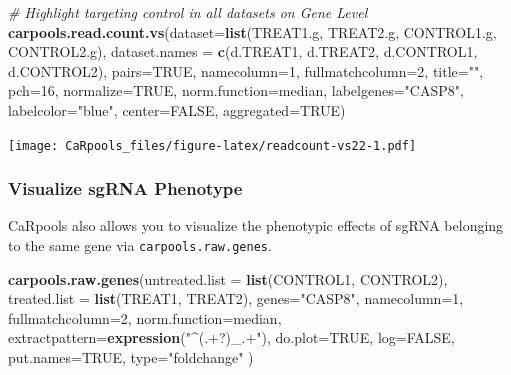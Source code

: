 \documentclass[]{article}
\newenvironment{Shaded}{\begin{snugshade}}{\end{snugshade}}
\newcommand{\KeywordTok}[1]{\textcolor[rgb]{0.13,0.29,0.53}{\textbf{{#1}}}}
\newcommand{\DataTypeTok}[1]{\textcolor[rgb]{0.13,0.29,0.53}{{#1}}}
\newcommand{\DecValTok}[1]{\textcolor[rgb]{0.00,0.00,0.81}{{#1}}}
\newcommand{\StringTok}[1]{\textcolor[rgb]{0.31,0.60,0.02}{{#1}}}
\newcommand{\CommentTok}[1]{\textcolor[rgb]{0.56,0.35,0.01}{\textit{{#1}}}}
\newcommand{\OtherTok}[1]{\textcolor[rgb]{0.56,0.35,0.01}{{#1}}}
\newcommand{\NormalTok}[1]{{#1}}
\begin{document}
\begin{Shaded}
\begin{Highlighting}[]
\CommentTok{# Highlight targeting control in all datasets on Gene Level}
\KeywordTok{carpools.read.count.vs}\NormalTok{(}\DataTypeTok{dataset=}\KeywordTok{list}\NormalTok{(TREAT1.g, TREAT2.g, CONTROL1.g, CONTROL2.g),}
  \DataTypeTok{dataset.names =} \KeywordTok{c}\NormalTok{(d.TREAT1, d.TREAT2, d.CONTROL1, d.CONTROL2), }\DataTypeTok{pairs=}\OtherTok{TRUE}\NormalTok{, }\DataTypeTok{namecolumn=}\DecValTok{1}\NormalTok{,}
  \DataTypeTok{fullmatchcolumn=}\DecValTok{2}\NormalTok{, }\DataTypeTok{title=}\StringTok{""}\NormalTok{, }\DataTypeTok{pch=}\DecValTok{16}\NormalTok{, }\DataTypeTok{normalize=}\OtherTok{TRUE}\NormalTok{, }\DataTypeTok{norm.function=}\NormalTok{median,}
  \DataTypeTok{labelgenes=}\StringTok{"CASP8"}\NormalTok{, }\DataTypeTok{labelcolor=}\StringTok{"blue"}\NormalTok{, }\DataTypeTok{center=}\OtherTok{FALSE}\NormalTok{, }\DataTypeTok{aggregated=}\OtherTok{TRUE}\NormalTok{)}
\end{Highlighting}
\end{Shaded}

\texttt{[image: CaRpools\_files/figure-latex/readcount-vs22-1.pdf]}

\newpage

\subsubsection{Visualize sgRNA
Phenotype}\label{visualize-sgrna-phenotype}

CaRpools also allows you to visualize the phenotypic effects of sgRNA
belonging to the same gene via \texttt{carpools.raw.genes}.

\begin{Shaded}
\begin{Highlighting}[]
\KeywordTok{carpools.raw.genes}\NormalTok{(}\DataTypeTok{untreated.list =} \KeywordTok{list}\NormalTok{(CONTROL1, CONTROL2),}
  \DataTypeTok{treated.list =} \KeywordTok{list}\NormalTok{(TREAT1, TREAT2), }\DataTypeTok{genes=}\StringTok{"CASP8"}\NormalTok{, }\DataTypeTok{namecolumn=}\DecValTok{1}\NormalTok{,}
  \DataTypeTok{fullmatchcolumn=}\DecValTok{2}\NormalTok{, }\DataTypeTok{norm.function=}\NormalTok{median, }\DataTypeTok{extractpattern=}\KeywordTok{expression}\NormalTok{(}\StringTok{"^(.+?)_.+"}\NormalTok{), }
  \DataTypeTok{do.plot=}\OtherTok{TRUE}\NormalTok{, }\DataTypeTok{log=}\OtherTok{FALSE}\NormalTok{, }\DataTypeTok{put.names=}\OtherTok{TRUE}\NormalTok{, }\DataTypeTok{type=}\StringTok{"foldchange"} \NormalTok{)}
\end{Highlighting}
\end{Shaded}
\end{document}
